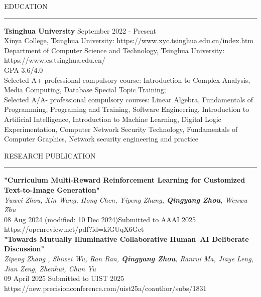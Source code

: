 \documentclass{resume} %
\renewenvironment{rSection}[1]{
\sectionskip
\textcolor{TsinghuaPurple}{\MakeUppercase{#1}}
\sectionlineskip
\hrule
\begin{list}{}{
\setlength{\leftmargin}{0em}
}
\item[]
}{
\end{list}
}
\begin{document}
  


\begin{rSection}{Education}

{\bf Tsinghua University} \hfill
{September 2022 - Present}\\ 
Xinya College, Tsinghua University: https://www.xyc.tsinghua.edu.cn/index.htm
\\
Department of Computer Science and Technology, Tsinghua University: https://www.cs.tsinghua.edu.cn/
\\
GPA 3.6/4.0
\\
Selected A+ professional compulsory course: Introduction to Complex Analysis, Media Computing, Database Special Topic Training; \\
Selected A/A- professional compulsory courses: Linear Algebra, Fundamentals of Programming, Programing and Training, Software Engineering, Introduction to Artificial Intelligence, Introduction to Machine Learning, Digital Logic Experimentation, Computer Network Security Technology, 	Fundamentals of Computer Graphics, Network security engineering and practice\\


\end{rSection} 

\begin{rSection}{ Research Publication } \itemsep -3pt        
{\textbf{"Curriculum Multi-Reward Reinforcement Learning for Customized Text-to-Image Generation"}\\
 \textit{Yuwei Zhou, Xin Wang, Hong Chen, Yipeng Zhang, \textbf{Qingyang Zhou}, Wenwu Zhu }\\
 08 Aug 2024 (modified: 10 Dec 2024)Submitted to AAAI 2025}\\
 https://openreview.net/pdf?id=kiGUqX6Gct\\

 {\textbf{"Towards Mutually Illuminative Collaborative Human–AI Deliberate Discussion"}\\
 \textit{Zipeng Zhang , Shiwei Wu, Ran Ran, \textbf{Qingyang Zhou}, Ranrui Ma, Jiaye Leng, Jian Zeng, Zhenhui, Chun Yu }\\
 09 April 2025 Submitted to UIST 2025}\\
 https://new.precisionconference.com/uist25a/coauthor/subs/1831\\
 
\end{rSection}
\end{document}
